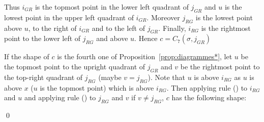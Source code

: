 \documentclass[11pt]{article}
\newenvironment{pf}{{\em \noindent Proof:}}{ \hfill \qed\smallskip}
\newcommand{\rmnum}[1]{\romannumeral #1}
\newcommand{\Vpoint}[2]{\draw (#1,#2) [darkgreen,fill=darkgreen] circle (3pt);}
\newcommand{\Hpoint}[2]{\draw (#1,#2) [darkred,fill=darkred] circle (3pt);}
\newcommand{\zoneRG}[3]{
\draw [very thick,H,Hpoint] (#1,#2) -- +(-#3,0);
\draw [very thick,V,Vpoint] (#1,#2) -- +(0,#3);
\draw [Hfill] (#1,#2) -- +(-#3,#3) -- +(-#3,0);
\draw [Vfill] (#1,#2) -- +(-#3,#3) -- + (0,#3);
}
\newcommand{\zoneGR}[3]{
\draw [very thick,H,Hpoint] (#1,#2) -- +(-#3,0);
\draw [very thick,V,Vpoint] (#1,#2) -- +(0,#3);
\draw [Vfill] (#1,#2) -- +(-#3,#3) -- +(-#3,0);
\draw [Hfill] (#1,#2) -- +(-#3,#3) -- + (0,#3);
}
\begin{document}
\begin{pf}
\begin{minipage}{.15\textwidth}
\end{minipage}
\begin{minipage}{.8\textwidth}
Thus $i_{GR}$ is the topmost point in the lower left quadrant of $j_{GR}$ and 
$u$ is the lowest point in the upper left quadrant of $i_{GR}$. 
Moreover $j_{RG}$ is the lowest point above $u$, to the right of $i_{GR}$ and to the left of $j_{GR}$. 
Finally, $i_{RG}$ is the rightmost point to the lower left of $j_{RG}$ and above $u$.
Hence $c = C_7(\sigma, j_{GR})$
\end{minipage}

If the shape of $c$ is the fourth one of Proposition~\ref{prop:diagrammes*},
let $u$ be the topmost point to the upright quadrant of $j_{GR}$
and $v$ be the rightmost point to the top-right quadrant of $j_{RG}$ (maybe $v = j_{RG}$).
Note that $u$ is above $i_{RG}$ as $u$ is above $x$ ($u$ is the topmost point) which is above $i_{RG}$.
Then applying rule (\rmnum{2}) to $i_{RG}$ and $u$
and applying rule (\rmnum{3}) to $j_{RG}$ and $v$ if $v \neq j_{RG}$, $c$ has the following shape:


\end{pf}
\end{document}
